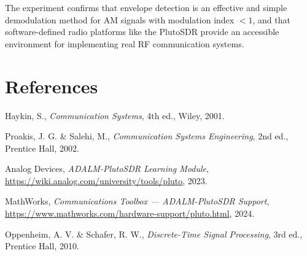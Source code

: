 \documentclass[12pt,a4paper]{article}
\begin{document}
The experiment confirms that envelope detection is an effective and simple
demodulation method for AM signals with modulation index $< 1$, and that
software-defined radio platforms like the PlutoSDR provide an accessible
environment for implementing real RF communication systems.

\section*{References}

\begin{enumerate}[label={[\arabic*]}]
  \item Haykin, S., \textit{Communication Systems}, 4th ed., Wiley, 2001.
  \item Proakis, J. G. \& Salehi, M., \textit{Communication Systems Engineering},
        2nd ed., Prentice Hall, 2002.
  \item Analog Devices, \textit{ADALM-PlutoSDR Learning Module},
        \url{https://wiki.analog.com/university/tools/pluto}, 2023.
  \item MathWorks, \textit{Communications Toolbox — ADALM-PlutoSDR Support},
        \url{https://www.mathworks.com/hardware-support/pluto.html}, 2024.
  \item Oppenheim, A. V. \& Schafer, R. W., \textit{Discrete-Time Signal
        Processing}, 3rd ed., Prentice Hall, 2010.
\end{enumerate}
\end{document}
